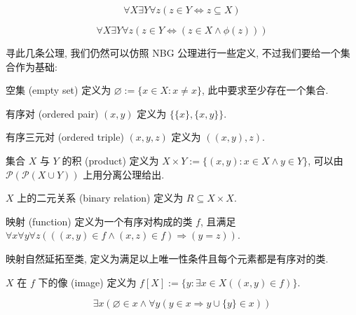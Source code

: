 \begin{axiom}
    \label {axiom:ZF Axiom of Power Set}
    \[
        \forall X \exists Y \forall z (z \in Y \Leftrightarrow z \subseteq X)
    \]
\end{axiom}

\begin{axiom}
    \label {axiom:ZF Axiom Schema of Separations}
    \[
        \forall X \exists Y \forall z (z \in Y \Leftrightarrow (z \in X \land \phi (z)))
    \]
\end{axiom}

寻此几条公理, 我们仍然可以仿照 NBG 公理进行一些定义, 不过我们要给一个集合作为基础:

\begin{definition}
    \label {definition:ZF empty set}
    空集 (empty set) 定义为 \(\varnothing := \{x \in X : x \neq x\}\), 此中要求至少存在一个集合.

    \label {definition:ZF ordered pair}
    有序对 (ordered pair) \((x,y)\) 定义为 \(\{\{x\},\{x,y\}\}\).

    \label {definition:ZF ordered triple}
    有序三元对 (ordered triple) \((x,y,z)\) 定义为 \(((x,y),z)\).

    \label {definition:ZF set product}
    集合 \(X\) 与 \(Y\) 的积 (product) 定义为 \(X \times Y := \{(x,y) : x \in X \land y \in Y\}\),
    可以由 \(\mathcal{P} (\mathcal{P} (X \cup Y))\) 上用分离公理给出.

    \label {definition:ZF binary relation}
    \(X\) 上的二元关系 (binary relation) 定义为 \(R \subseteq X \times X\).

    \label {definition:ZF function}
    映射 (function) 定义为一个有序对构成的类 \(f\), 且满足
    \(\forall x \forall y \forall z (((x,y) \in f \land (x,z) \in f) \Rightarrow (y = z))\).

    映射自然延拓至类, 定义为满足以上唯一性条件且每个元素都是有序对的类.

    \label {definition:ZF image}
    \(X\) 在 \(f\) 下的像 (image) 定义为 \(f[X] := \{y : \exists x \in X ((x,y) \in f)\}\).
\end{definition}

\begin{axiom}
    \label {axiom:ZF Axiom of Infinity}
    \[
        \exists x (\varnothing \in x \land \forall y (y \in x \Rightarrow y \cup \{y\} \in x))
    \]
\end{axiom}

